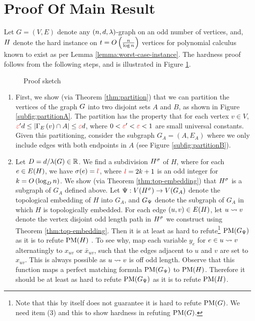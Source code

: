 \documentclass[11pt]{article}
\begin{document}
\section{Proof Of Main Result}
\label{sec:main-proof}

Let $G=(V,E)$ denote any $(n, d, \lambda)$-graph on an odd number of vertices, and,  $H$ denote the hard instance on $t=O\left(\frac{n}{\log n}\right)$ vertices for polynomial calculus known to exist as per Lemma \ref{lemma:worst-case-instance}.
The hardness proof follows from the following steps, and is illustrated in Figure \ref{fig:proof-outline}.


\begin{figure}
	\caption{Proof sketch}
	\label{fig:proof-outline}
\end{figure}

\begin{enumerate}
	\item First, we show (via Theorem \ref{thm:partition}) that we can partition the vertices of the graph $G$ into two disjoint sets $A$ and $B$, as shown in Figure \ref{subfig:partitionA}. The partition has the property that for each vertex $v \in V$, $\textcolor{red}{\varepsilon}'d \leq |\Gamma_{E}\left(v\right) \cap A| \leq \textcolor{red}{\varepsilon} d$, where $0 <\textcolor{red}{\varepsilon} '< \textcolor{red}{\varepsilon} < 1$ are small universal constants. Given this partitioning, consider the subgraph $G_A = (A, E_A)$ where we only include edges with both endpoints in $A$ (see Figure \ref{subfig:partitionB}).
	\item Let $D = d/\lambda(G) \in \mathbb{R}$. We find a subdivision ${H}^{\sigma}$ of $H$, where for each $e \in E(H)$, we have $\sigma(e) = \textcolor{red}{l}$, where $\textcolor{red}{l} = 2k+1$ is an odd integer for $k = O\left(\log_{D} n\right)$. We show (via Theorem \ref{thm:top-embedding}) that ${H}^{\sigma}$ is a subgraph of $G_A$ defined above. Let $\Psi: V({H}^{\sigma}) \rightarrow V(G_A)$ denote the topological embedding of $H$ into $G_A$, and $G_{\Psi}$ denote the subgraph of $G_A$ in which $H$ is topologically embedded. For each edge $(u,v) \in E(H)$, let $u \rightsquigarrow v$ denote the vertex disjoint odd length path in ${H}^{\sigma}$ we construct using Theorem \ref{thm:top-embedding}. Then it is at least as hard to refute\footnote{Note that this by itself does not guarantee it is hard to refute $\text{PM}(G)$. We need item (3) and this to show hardness in refuting $\text{PM}(G)$.} $\text{PM}(G_{\Psi})$ as it is to refute $\text{PM}(H)$ . To see why, map each variable $y_e$ for $e \in u \rightsquigarrow v$ alternatingly to $x_{uv}$ or $\bar{x}_{uv}$, such that the edges adjacent to $u$ and $v$ are set to $x_{uv}$. This is always possible as $u \rightsquigarrow v$ is off odd length. Observe that this function maps a perfect matching formula  $\text{PM}(G_{\Psi})$ to $\text{PM}(H)$. Therefore it should be at least as hard to refute $\text{PM}(G_{\Psi})$ as it is to refute $\text{PM}(H)$.
	

\end{enumerate}
\end{document}
